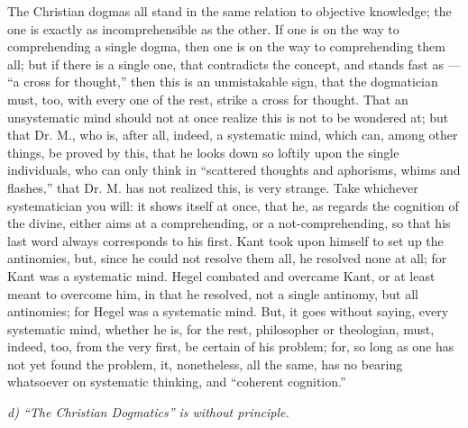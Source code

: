 \documentclass[12pt]{book}
\begin{document}
The Christian dogmas all stand in the same relation
to objective knowledge; the one is exactly as incomprehensible as the other. If one is on the way to comprehending a single dogma, then one is on the way to comprehending them all; but if there is a single one, that contradicts the concept, and stands fast as --- ``a cross for thought,'' then this is an unmistakable sign, that the dogmatician must, too, with every one of the rest, strike a cross for thought. That an unsystematic mind should not at once realize this is not to be wondered at; but that Dr. M., who is, after all, indeed, a systematic mind, which can, among other things, be proved by this, that he looks down so loftily upon the single individuals, who can only think in ``scattered thoughts and aphorisms, whims and flashes,'' that Dr. M. has not realized this, is very strange. Take whichever systematician you will: it shows itself at once, that he, as regards the cognition of the divine, either aims at a comprehending, or a not-comprehending, so that his last word always corresponds to his first. Kant took upon himself to set up the antinomies, but, since he could not resolve them all, he resolved none at all; for Kant was a systematic mind. Hegel combated and overcame Kant, or at least meant to overcome him, in that he
resolved, not a single antinomy, but all antinomies; for Hegel was a systematic mind. But, it goes without saying, every systematic mind, whether he is, for the rest, philosopher or theologian, must, indeed, too, from the very first, be certain of his problem; for, so long as one has not yet found the problem, it, nonetheless, all the same, has no bearing whatsoever on systematic thinking, and ``coherent cognition.''

\begin{center}
\emph{d) ``The Christian Dogmatics'' is without principle.}
\end{center}
\end{document}
